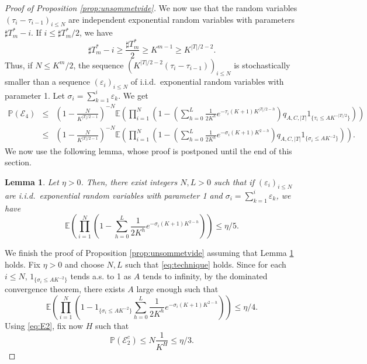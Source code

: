 \documentclass[french]{article}
\newtheorem{lemma}[theorem]{Lemma}
\newcommand{\E}{\mathbb{E}}
\renewcommand{\P}{\mathbb{P}}
\newcommand{\Tf}{T}
\renewcommand{\1}{\mathds{1}}
\begin{document}
\begin{proof}[Proof of Proposition \ref{prop:unsommetvide}]
We now use that the random variables $(\tau_i-\tau_{i-1})_{i\le N}$ are independent exponential random variables with parameters $\sharp\Tf_m^* - i$. If $i\le \sharp\Tf_m^*/2$, we have
$$\sharp\Tf_m^* - i\ge  \frac{\sharp\Tf_m^*}{2}\ge K^{m-1}\ge K^{|\Tf|/2-2}.$$
Thus, if $N\le K^m/2$, the sequence $(K^{|\Tf|/2-2}(\tau_i-\tau_{i-1}))_{i\le N}$ is stochastically smaller than a sequence $(\varepsilon_i)_{i\le N}$ of i.i.d.\ exponential random variables with parameter 1. Let $\sigma_i=\sum_{k=1}^i\varepsilon_k$.
We get 
\begin{eqnarray*}
\P(\mathcal{E}_4)
&\le&  \left(1-\frac{N}{K^{|\Tf|/2-1}}\right)^{-N}\E\left(\prod_{i=1}^N \left(1-\left(\sum_{h=0}^L\frac{1}{2K^h}e^{-\tau_i(K+1)K^{|\Tf|/2-h}}\right) q_{A,C,|\Tf|}1_{\{\tau_i\le A K^{-|\Tf|/2}\}}
\right)\right)\\
&\le& \left(1-\frac{N}{K^{|\Tf|/2-1}}\right)^{-N}\E\left(\prod_{i=1}^N \left(1-\left(\sum_{h=0}^L\frac{1}{2K^h}e^{-\sigma_i(K+1)K^{2-h}}\right) q_{A,C,|\Tf|}1_{\{\sigma_i\le A K^{-2}\}}
\right)\right).
\end{eqnarray*}
We now use the following lemma, whose proof is postponed until the end of this section.
\begin{lemma}\label{lem:technique}
    Let $\eta>0$. Then, there exist integers $N,L>0$ such that if $(\varepsilon_i)_{i\le N}$ are i.i.d.\ exponential random variables with parameter 1 and $\sigma_i=\sum_{k=1}^i\varepsilon_k$, we have 
    \begin{equation}\label{eq:technique}
        \E\left(\prod_{i=1}^N \left(1-\sum_{h=0}^L\frac{1}{2K^h}e^{-\sigma_i(K+1)K^{2-h}}\right) \right)\le \eta/5.
    \end{equation}    
\end{lemma}
We finish the proof of Proposition \ref{prop:unsommetvide} assuming that Lemma \ref{lem:technique} holds. Fix $\eta>0$ and choose $N,L$ such that \eqref{eq:technique} holds. Since for each $i\le N$, $1_{\{\sigma_i\le A K^{-2}\}}$ tends a.s. to 1 as $A$ tends to infinity, by the dominated convergence theorem, there exists $A$ large enough such that 
\begin{equation*}
        \E\left(\prod_{i=1}^N \left(1-1_{\{\sigma_i\le A K^{-2}\}}\sum_{h=0}^L\frac{1}{2K^h}e^{-\sigma_i(K+1)K^{2-h}}\right) \right)\le \eta/4.
    \end{equation*}
Using \eqref{eq:E2}, fix now $H$ such that 
\begin{equation*}
\P(\mathcal{E}_2^c)\le N\frac{1}{K^{H}}\le \eta/3.
\end{equation*}

\end{proof}
\end{document}
